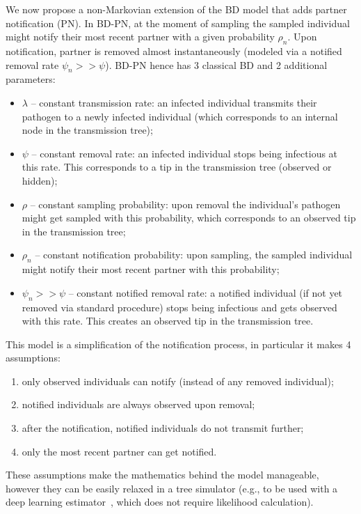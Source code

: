 \documentclass[a4paper,10pt]{article}
\begin{document}
We now propose a non-Markovian extension of the BD model that adds partner notification (PN).  In BD-PN, at the moment of sampling the sampled individual might notify their most recent partner with a given probability $\rho_n$. Upon notification, partner is removed almost instantaneously (modeled via a notified removal rate $\psi_n >> \psi$). BD-PN hence has 3 classical BD and 2 additional parameters:
\begin{itemize}
 \item $\lambda$ -- constant transmission rate: an infected individual transmits their pathogen to a newly infected individual (which corresponds to an internal node in the transmission tree);
 \item $\psi$ -- constant removal rate: an infected individual stops being infectious at this rate. This corresponds to a tip in the transmission tree (observed or hidden);
 \item $\rho$ -- constant sampling probability: upon removal the individual's pathogen might get sampled with this probability, which corresponds to an observed tip in the transmission tree;
 \item $\rho_n$ -- constant notification probability: upon sampling, the sampled individual might notify their most recent partner with this probability;
 \item $\psi_n >> \psi$ -- constant notified removal rate: a notified individual (if not yet removed via standard procedure) stops being infectious and gets observed with this rate. This creates an observed tip in the transmission tree.
\end{itemize}


This model is a simplification of the notification process, in particular it makes 4 assumptions:
\begin{enumerate}
\item only observed individuals can notify (instead of any removed individual);
\item notified individuals are always observed upon removal;
\item after the notification, notified individuals do not transmit further;
\item only the most recent partner can get notified.
\end{enumerate}

These assumptions make the mathematics behind the model manageable, however they can be easily relaxed in a tree simulator (e.g., to be used with a deep learning estimator~\cite{Voznica2021}, which does not require likelihood calculation).
\end{document}
